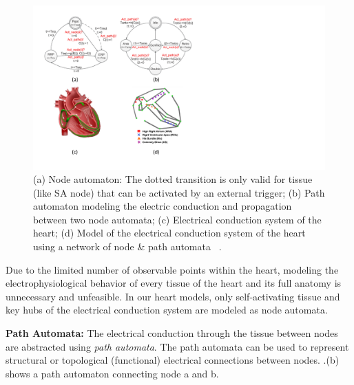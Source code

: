 \begin{figure}[!t]
		\includegraphics[width=\textwidth]{figs/automata.pdf}

\caption{\small (a) Node automaton: The dotted transition is only valid for tissue (like SA node) that can be activated by an external trigger; (b) Path automaton modeling the electric conduction and propagation between two node automata; (c) Electrical conduction system of the heart; (d) Model of the electrical conduction system of the heart using a network of node \& path automata ~\cite{VHM_proc}.}\label{fig:automata}
\end{figure} 

Due to the limited number of observable points within the heart, modeling the electrophysiological behavior of every tissue of the heart and its full anatomy is unnecessary and unfeasible. In our heart models, only self-activating tissue and key hubs of the electrical conduction system are modeled as node automata. 

\textbf{Path Automata:} The electrical conduction through the tissue between nodes are abstracted using \emph{path automata}. The path automata can be used to represent structural or topological (functional) electrical connections between nodes. .(b) shows a path automaton connecting node a and b.

